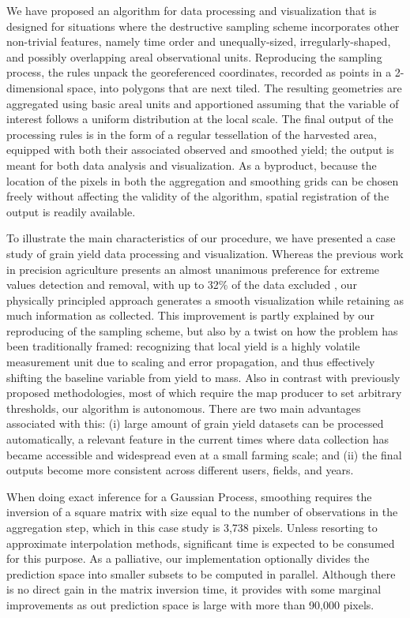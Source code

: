 \documentclass[12pt]{article}
\begin{document}
We have proposed an algorithm
for data processing and visualization that is designed for situations
where the destructive sampling scheme incorporates other non-trivial
features, namely time order and unequally-sized, irregularly-shaped,
and possibly overlapping areal observational units. Reproducing the
sampling process, the rules unpack the georeferenced coordinates,
recorded as points in a 2-dimensional space, into polygons that are
next tiled. The resulting geometries are aggregated using basic areal
units and apportioned assuming that the variable of interest follows a
uniform distribution at the local scale. The final output of the
processing rules is in the form of a regular tessellation of the
harvested area, equipped with both their associated observed and
smoothed yield; the output is meant for both data analysis and
visualization. As a byproduct, because the location of the pixels in
both the aggregation and smoothing grids can be chosen freely without
affecting the validity of the algorithm, spatial registration of the
output is readily available.

To illustrate the main
characteristics of our procedure, we have presented a case study of
grain yield data processing and visualization. Whereas the previous
work in precision agriculture presents an almost unanimous preference
for extreme values detection and removal, with up to 32\% of the data
excluded \cite{Lyle2013}, our physically principled approach generates
a smooth visualization while retaining as much information as
collected. This improvement is partly explained by our reproducing of
the sampling scheme, but also by a twist on how the problem has been
traditionally framed: recognizing that local yield is a highly
volatile measurement unit due to scaling and error propagation, and
thus effectively shifting the baseline variable from yield to
mass. Also in contrast with previously proposed methodologies, most of
which require the map producer to set arbitrary thresholds, our
algorithm is autonomous. There are two main advantages associated with
this: (i) large amount of grain yield datasets can be processed
automatically, a relevant feature in the current times where data
collection has became accessible and widespread even at a small
farming scale; and (ii) the final outputs become more consistent
across different users, fields, and years.

When doing exact inference for a Gaussian Process, smoothing requires
the inversion of a square matrix with size equal to the number of
observations in the aggregation step, which in this case study is
3,738 pixels. Unless resorting to approximate interpolation methods,
significant time is expected to be consumed for this purpose. As a
palliative, our implementation optionally divides the prediction space
into smaller subsets to be computed in parallel. Although there is no
direct gain in the matrix inversion time, it provides with some
marginal improvements as out prediction space is large with more than
90,000 pixels.
\end{document}
